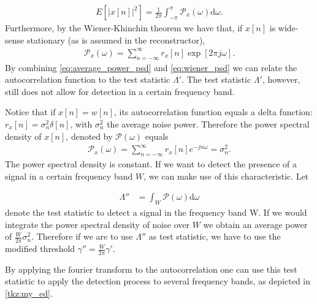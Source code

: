 \documentclass[a4paper, openany, oneside]{memoir}
\begin{document}
\begin{align}\label{eq:average_power_psd}
E\left[\left|x[n]\right|^2\right] = \frac{1}{2\pi} \int_{-\pi}^{\pi}\mathcal{P}_x(\omega) \text{d}\omega.
\end{align}
Furthermore, by the Wiener-Khinchin theorem we have that, if $x[n]$ is wide-sense stationary (as is assumed in the reconstructor),
\begin{align}\label{eq:wiener_psd}
	\mathcal{P}_x(\omega) = \sum_{n=-\infty}^{\infty} r_x[n] \exp [2\pi j\omega].
\end{align}
By combining \cref{eq:average_power_psd} and \cref{eq:wiener_psd} we can relate the autocorrelation function to the test statistic $\Lambda'$.
The test statistic $\Lambda'$, however, still does not allow for detection in a certain frequency band.

 Notice that if $x[n]=w[n]$, its autocorrelation function equals a delta function: $r_x[n] = \sigma_n^2\delta[n]$, with $\sigma_n^2$ the average noise power. 
 Therefore the power spectral density of $x[n]$, denoted by $\mathcal{P}(\omega)$ equals  
 \begin{align*}
 \mathcal{P}_x(\omega) = \sum_{n=-\infty}^{\infty}r_x[n]e^{-jn\omega} = \sigma_n^2.
 \end{align*} The power spectral density is constant. If we want to detect the presence of a signal in a certain frequency band $W$, we can make use of this characteristic. Let

 \begin{align*}
 \Lambda'' &= \int_W \mathcal{P}(\omega) \text{d}\omega
 \end{align*}
denote the test statistic to detect a signal in the frequency band W.
 If we would integrate the power spectral density of noise over $W$ we obtain an average power of  $\frac{W}{2\pi} \sigma_n^2$. Therefore if we are to use $\Lambda''$ as test statistic, we have to use the modified threshold $\gamma'' = \frac{W}{2\pi} \gamma'$.

 By applying the fourier transform to the autocorrelation one can use this test statistic to apply the detection process to several frequency bands, as depicted in \cref{tkz:my_ed}.
\end{document}
